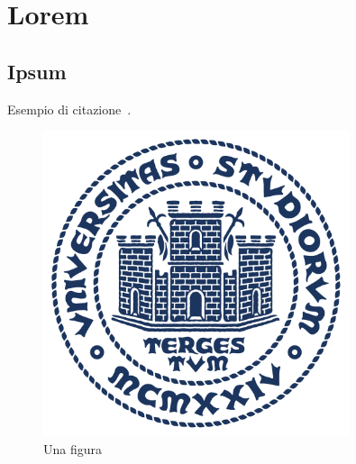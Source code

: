 \chapter{Lorem}\label{ch:lorem}

\section{Ipsum}\label{sec:ipsum}

    Esempio di citazione~\cite{latexcompanion}.

    \begin{figure}[!ht]
        \centering
        \includegraphics[width=0.8\textwidth]{img/units_sigillo_pantone-534}
        \caption{Una figura}
        \label{fig:example}
    \end{figure}

    \lipsum[3]

